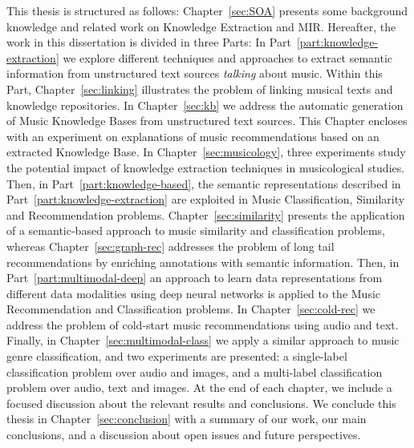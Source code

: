 This thesis is structured as follows: Chapter~\ref{sec:SOA} presents some background knowledge and related work on Knowledge Extraction and MIR. Hereafter, the work in this dissertation is divided in three Parts: In Part~\ref{part:knowledge-extraction} we explore different techniques and approaches to extract semantic information from unstructured text sources \textit{talking} about music. Within this Part, Chapter~\ref{sec:linking} illustrates the problem of linking musical texts and knowledge repositories. In Chapter~\ref{sec:kb} we address the automatic generation of Music Knowledge Bases from unstructured text sources. This Chapter encloses with an experiment on explanations of music recommendations based on an extracted Knowledge Base. In Chapter~\ref{sec:musicology}, three experiments study the potential impact of knowledge extraction techniques in musicological studies.
Then, in Part~\ref{part:knowledge-based}, the semantic representations described in Part~\ref{part:knowledge-extraction} are exploited in Music Classification, Similarity and Recommendation problems. Chapter~\ref{sec:similarity} presents the application of a semantic-based approach to music similarity and classification problems, whereas Chapter~\ref{sec:graph-rec} addresses the problem of long tail recommendations by enriching annotations with semantic information.
Then, in Part~\ref{part:multimodal-deep} an approach to learn data representations from different data modalities using deep neural networks is applied to the Music Recommendation and Classification problems. In Chapter~\ref{sec:cold-rec} we address the problem of cold-start music recommendations using audio and text. Finally, in Chapter~\ref{sec:multimodal-class} we apply a similar approach to music genre classification, and two experiments are presented: a single-label classification problem over audio and images, and a multi-label classification problem over audio, text and images.
At the end of each chapter, we include a focused discussion about the relevant results and conclusions. We conclude this thesis in Chapter~\ref{sec:conclusion} with a summary of our work, our main conclusions, and a discussion about open issues and future perspectives.




